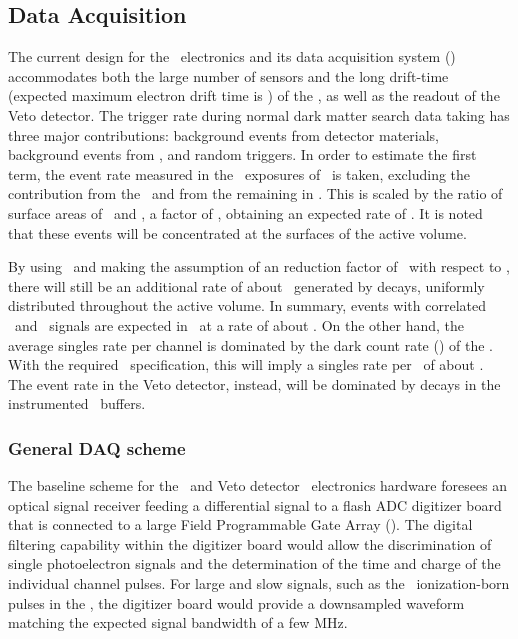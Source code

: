 \subsection{Data Acquisition}
\label{sec:DAQ}

The current design for the \DSks\ electronics and its data acquisition system (\DAQ) accommodates both the large number of sensors and the long drift-time (expected maximum electron drift time is \DSkDriftTimeBig) of the \LArTPC, as well as the readout of the Veto detector.  The trigger rate during normal dark matter search data taking has three major contributions: background events from detector materials, background events from , and random triggers.  In order to estimate the first term, the event rate measured in the \UAr\ exposures of \DSfs\ is taken, excluding the contribution from the \PMTs\ and from the remaining  in \DSfs.  This is scaled by the ratio of surface areas of \DSks\ and \DSfs, a factor of \DSkOverDSfAreaRatio, obtaining an expected rate of \DSkTriggerSurfaceRate.  It is noted that these events will be concentrated at the surfaces of the active volume.  

By using \UAr\ and making the assumption of an  reduction factor of \DSkDArThreeNineDepletion\ with respect to \AAr,  there will still be an additional rate of about \DSkTriggerDArThreeNineRate\ generated by  decays, uniformly distributed throughout the active volume.  In summary, events with correlated \SOne\ and \STwo\ signals are expected in \DSks\ at a rate of about \DSkTriggerTotalRateBig.  On the other hand, the average singles rate per channel is dominated by the dark count rate (\DCR) of the \SiPMs.  With the required \DSkSiPMDCRSpecificationBig\ specification, this will imply a singles rate per \DSkPdm\ of about  \DSkTileDCRSpecificationBig.  The event rate in the Veto detector, instead, will be dominated by  decays in the instrumented \AAr\ buffers. 


\subsubsection{General DAQ scheme}

The baseline scheme for the \TPC\ and Veto detector \DAQ\ electronics hardware foresees an optical signal receiver feeding a differential signal to a flash ADC digitizer board that is connected to a large Field Programmable Gate Array (\FPGA).  The digital filtering capability within the digitizer board would allow the discrimination of single photoelectron signals and the determination of the time and charge of the individual channel pulses.  For large and slow signals, such as the \STwo\ ionization-born pulses in the \TPC, the digitizer board would provide a downsampled waveform matching the expected signal bandwidth of a few \si{\MHz}. 

